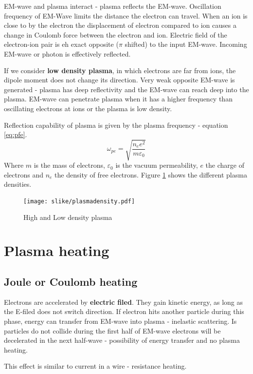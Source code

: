 EM-wave and plasma interact - plasma reflects the EM-wave. Oscillation frequency of EM-Wave limits the distance the electron can travel. When an ion is close to
by the electron the displacement of electron compared to ion causes a change in Coulomb force between the electron and ion.
Electric field of the electron-ion pair is eh exact opposite ($\pi$ shifted) to the input EM-wave. 
Incoming EM-wave or photon is effectively reflected.

If we consider \textbf{low density plasma}, in which electrons are far from ions, the dipole moment does not change its direction.
Very weak opposite EM-wave is generated - plasma has deep reflectivity and the EM-wave can reach 
deep into the plasma.
EM-wave can penetrate plasma when it has a higher frequency than oscillating electrons at ions or the plasma is low density.

Reflection capability of plasma is given by the plasma frequency - equation \ref{eq:pfe}.
\begin{equation}
    \omega_{pe} = \sqrt{\frac{n_e e^2}{m \varepsilon_0}}
    \label{eq:pfe}
\end{equation}
Where $m$ is the mass of electrons, $\varepsilon_0$ is the vacuum permeability, $e$ the charge of electrons and $n_e$ the density of free electrons.
Figure \ref{fig:rhoplas} shows the different plasma densities. 
\begin{figure}[h!]
    \centering
    \texttt{[image: slike/plasmadensity.pdf]}
    \caption{High and Low density plasma}
    \label{fig:rhoplas}
\end{figure}


\section{Plasma heating}

\subsection{Joule or Coulomb heating}

Electrons are accelerated by \textbf{electric filed}.  They gain kinetic energy, as long as the
E-filed does not switch direction. If electron hits another particle during this phase, energy can transfer from 
EM-wave into plasma - inelastic scattering. Is particles do not collide during the first half of EM-wave electrons will be decelerated in the next half-wave - possibility of
energy transfer and no plasma heating.

This effect is similar to current in a wire - resistance heating.

